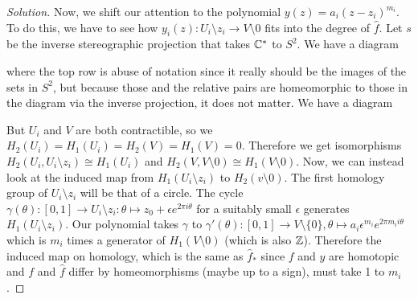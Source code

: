 \begin{proof}[Solution]
Now, we shift our attention to the polynomial $y(z) = a_i(z-z_i)^{m_i}$. To do this, we have to see how $y_i(z): U_i\setminus z_i \to V\setminus 0$ fits into the degree of $\hat{f}$. Let $s$ be the inverse stereographic projection that takes $\mathbb{C}^*$ to $S^2$. We have a diagram
\begin{center}
\end{center}
where the top row is abuse of notation since it really should be the images of the sets in $S^2$, but because those and the relative pairs are homeomorphic to those in the diagram via the inverse projection, it does not matter. We have a diagram
\begin{center}
\end{center}
But $U_i$ and $V$ are both contractible, so we $H_2(U_i) =H_1(U_i) = H_2(V) =H_1(V) = 0$. Therefore we get isomorphisms $H_2(U_i, U_i\setminus z_i) \cong H_1(U_i)$ and $H_2(V, V\setminus 0) \cong H_1(V\setminus 0)$. Now, we can instead look at the induced map from $H_1(U_i \setminus z_i)$ to $H_2(v\setminus 0)$.
The first homology group of $U_i\setminus z_i$ will be that of a circle. The cycle $\gamma(\theta): [0, 1] \to U_i\setminus z_i: \theta \mapsto z_0 + \epsilon e^{2\pi i \theta}$ for a suitably small $\epsilon$ generates $H_1(U_i \setminus z_i)$. Our polynomial takes $\gamma$ to $\gamma'(\theta) : [0, 1] \to V\setminus\{0\}, \theta \mapsto a_i\epsilon^{m_i} e^{2\pi m_i i \theta}$ which is $m_i$ times a generator of $H_1(V\setminus 0)$ (which is also $\mathbb{Z}$). Therefore the induced map on homology, which is the same as $\hat{f}_*$ since $f$ and $y$ are homotopic and $f$ and $\hat{f}$ differ by homeomorphisms (maybe up to a sign), must take 1 to $m_i$.


\end{proof}
